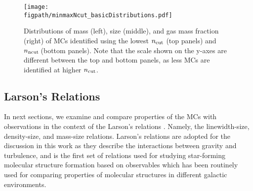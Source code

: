 \IfFileExists{emulateapjlegacy.cls}{\documentclass[iop]{emulateapjlegacy}}{\documentclass[iop]{emulateapj}}
\def\figpath{./Fig}
\begin{document}
\begin{figure*}[htbp]
\centering
\texttt{[image: \\figpath/minmaxNcut\_basicDistributions.pdf]}
\caption{Distributions of mass (left), size (middle), and gas mass fraction (right) of MCs identified using the lowest $n_{\rm cut}$ (top panels) and $n_{\rm ncut}$\,\cc (bottom panels).
Note that the scale shown on the y-axes are different between the top and bottom panels, as less MCs are identified at higher $n_{\rm cut}$.
\label{fig:dist}}
\end{figure*}


\subsection{Larson's Relations}\label{sec:PVE}

In next sections, we examine and compare properties of the MCs with observations in the context of the Larson's relations \citep{Larson81a}. Namely, the linewidth-size, density-size, and mass-size relations. Larson's relations are adopted for the discussion in this work as they  describe the interactions between gravity and turbulence, and is the first set of relations used for studying star-forming molecular structure formation based on observables which has been routinely used for comparing properties of molecular structures in different galactic environments.
\end{document}
